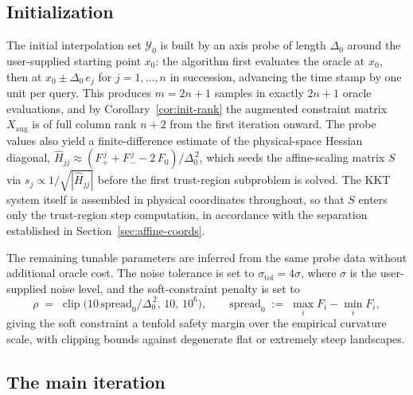 \documentclass[11pt,a4paper]{article}
\begin{document}
\subsection{Initialization}
\label{sec:init}

The initial interpolation set $\mathcal{Y}_0$ is built by an axis
probe of length $\Delta_0$ around the user-supplied starting point
$x_0$: the algorithm first evaluates the oracle at $x_0$, then at
$x_0 \pm \Delta_0\,e_j$ for $j = 1, \dots, n$ in succession,
advancing the time stamp by one unit per query. This produces
$m = 2n+1$ samples in exactly $2n+1$ oracle evaluations, and by
Corollary~\ref{cor:init-rank} the augmented constraint matrix
$X_{\mathrm{aug}}$ is of full column rank $n+2$ from the first
iteration onward. The probe values also yield a finite-difference
estimate of the physical-space Hessian diagonal,
$\widehat{H}_{jj} \approx
(F_+^{\,j} + F_-^{\,j} - 2\,F_0)/\Delta_0^{\,2}$, which seeds the
affine-scaling matrix $S$ via $s_j \propto 1/\sqrt{|\widehat{H}_{jj}|}$
before the first trust-region subproblem is solved. The KKT system
itself is assembled in physical coordinates throughout, so that
$S$ enters only the trust-region step computation, in accordance
with the separation established in Section~\ref{sec:affine-coords}.

The remaining tunable parameters are inferred from the same probe
data without additional oracle cost. The noise tolerance is set to
$\sigma_{\mathrm{tol}} = 4\sigma$, where $\sigma$ is the user-supplied
noise level, and the soft-constraint penalty is set to
\begin{equation}\label{eq:rho-init}
  \rho \;=\;
  \operatorname{clip}\!\bigl(10\,\mathrm{spread}_0/\Delta_0^{\,2},
                             \,10,\,10^6\bigr),
  \qquad
  \mathrm{spread}_0 \;:=\; \max_i F_i - \min_i F_i,
\end{equation}
giving the soft constraint a tenfold safety margin over the
empirical curvature scale, with clipping bounds against degenerate
flat or extremely steep landscapes.

\subsection{The main iteration}
\label{sec:main-loop}
\end{document}
